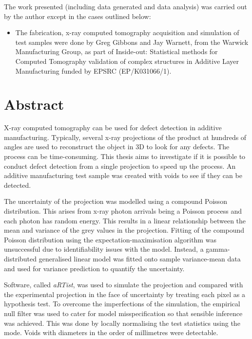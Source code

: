 \documentclass[12pt, a4paper, twoside]{memoir}
\begin{document}
The work presented (including data generated and data analysis) was carried out by the author except in the cases outlined below:
\begin{itemize}
  \item The fabrication, x-ray computed tomography acquisition and simulation of test samples were done by Greg Gibbons and Jay Warnett, from the Warwick Manufacturing Group, as part of Inside-out: Statistical methods for Computed Tomography validation of complex structures in Additive Layer Manufacturing funded by EPSRC (EP/K031066/1).
\end{itemize}

\chapter{Abstract}
X-ray computed tomography can be used for defect detection in additive manufacturing. Typically, several x-ray projections of the product at hundreds of angles are used to reconstruct the object in 3D to look for any defects. The process can be time-consuming. This thesis aims to investigate if it is possible to conduct defect detection from a single projection to speed up the process. An additive manufacturing test sample was created with voids to see if they can be detected.

The uncertainty of the projection was modelled using a compound Poisson distribution. This arises from x-ray photon arrivals being a Poisson process and each photon has random energy. This results in a linear relationship between the mean and variance of the grey values in the projection. Fitting of the compound Poisson distribution using the expectation-maximisation algorithm was unsuccessful due to identifiability issues with the model. Instead, a gamma-distributed generalised linear model was fitted onto sample variance-mean data and used for variance prediction to quantify the uncertainty.

Software, called \emph{aRTist}, was used to simulate the projection and compared with the experimental projection in the face of uncertainty by treating each pixel as a hypothesis test. To overcome the imperfections of the simulation, the empirical null filter was used to cater for model misspecification so that sensible inference was achieved. This was done by locally normalising the test statistics using the mode. Voids with diameters in the order of millimetres were detectable.

\newpage

\mainmatter
\end{document}
